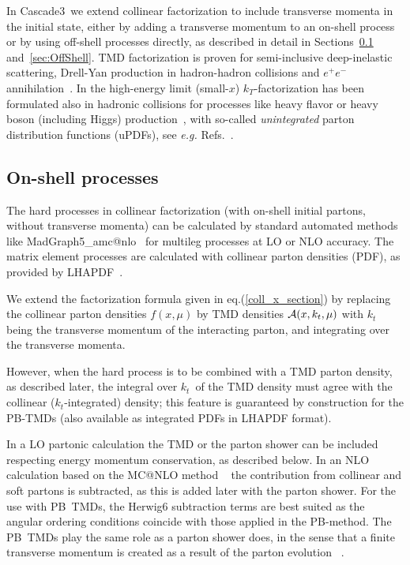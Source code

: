 \documentclass[11pt]{article} \usepackage{mystyle-new}
\makeatletter
\def\prp{t}
\def\kt{\ensuremath{k_{\prp}}}
\def\cascade{{\sc Cascade3}}
\def\herwig{{\sc Herwig}}
\def\MGvATNLO{{\sc MadGraph5}\_a{\sc mc@nlo}}
\def\PB{{PB}}
\newenvironment{tolerant}[1]{\par\tolerance=#1\relax}{ \par }
\makeatother
\begin{document}
In \cascade\ we extend collinear factorization to include transverse momenta in the initial state, either by adding a transverse momentum to an on-shell process or by using off-shell processes directly, as described in detail in Sections~\ref{sec:OnShell} and~\ref{sec:OffShell}.
TMD factorization is proven for semi-inclusive deep-inelastic scattering, Drell-Yan production in hadron-hadron collisions and $e^+e^-$ 
annihilation~\cite{Collins:1981uk,Collins:1981uw,Collins:1982wa,Collins:1981tt,Collins:1984kg,Collins:2011zzd,Meng:1995yn,Nadolsky:1999kb,Nadolsky:2000ky,Ji:2004wu,Ji:2004xq,GarciaEchevarria:2011rb,Chiu:2011qc}. In the high-energy limit (small-$x$) $k_T$-factorization has been formulated also in hadronic collisions for processes like heavy flavor or heavy boson (including Higgs) production~\cite{Catani:1990xk,Levin:1991ry,Collins:1991ty,
Hautmann:2002tu}, with so-called {\em unintegrated} parton distribution functions (uPDFs), 
see {\it e.g.} Refs.~\cite{Avsar:2012hj,Avsar:2011tz,Jadach:2009gm,Dominguez:2011saa,Dominguez:2011br,Dominguez:2011gc,Hautmann:2009zzb,Hautmann:2012pf,Hautmann:2007gw,Catani:1993ww,Catani:1994sq}.

\subsection{On-shell processes}
\label{sec:OnShell}
\begin{tolerant}{3000}
The hard processes in collinear factorization (with on-shell initial partons, without transverse momenta) can be calculated by standard automated methods like 
 \MGvATNLO~\cite{Alwall:2014hca} 
for multileg processes at LO or  NLO accuracy.  The matrix element processes are calculated with collinear parton densities (PDF), as provided by LHAPDF~\cite{Buckley:2014ana}. 

We extend the factorization formula given in eq.(\ref{coll_x_section}) by replacing the collinear parton densities $f(x,\mu)$ by TMD densities ${\cal A}(x,\kt,\mu)$ with $\kt$ being the transverse momentum of the interacting parton, and  integrating over the transverse momenta.

However, when the hard process is to be combined with a TMD parton density, as described later, the integral over \kt\ of the TMD density must agree with the collinear (\kt -integrated) density; this feature is guaranteed by construction for the \PB-TMDs (also available as integrated PDFs in LHAPDF format).
\end{tolerant}
In a LO partonic calculation the TMD or the parton shower can be included respecting energy momentum conservation, as described below. 
In an NLO calculation based on the MC@NLO method ~\cite{Frixione:2006gn,Frixione:2003ei,Frixione:2002bd,Frixione:2002ik} the contribution from collinear and soft partons is subtracted, as this is added later with the parton shower. For the use with \PB\ TMDs, the \herwig 6 subtraction terms are best suited as the angular ordering conditions coincide with those applied in the \PB -method. The \PB\ TMDs play the same role as a parton shower does, in the sense that a finite transverse momentum is created as a result of the parton evolution~ \cite{Dooling:2012uw,Hautmann:2012dw}.
\end{document}
